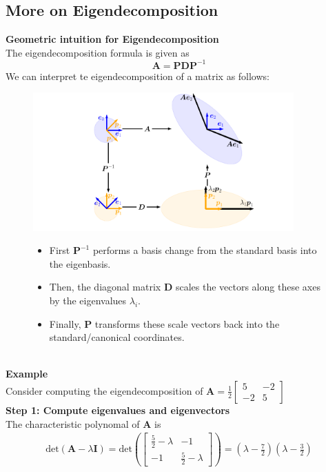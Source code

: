 \documentclass{report}
\begin{document}
\subsection{More on Eigendecomposition}%
\textbf{Geometric intuition for Eigendecomposition}\\
The eigendecomposition formula is given as
\begin{equation*}
\bm{A}=\bm{PDP}^{-1}
\end{equation*}
We can interpret te eigendecomposition of a matrix as follows: 
\begin{figure}[h]
\includegraphics[width=10cm]{20}\\
\centering
\begin{itemize}
\item First $\bm{P}^{-1}$ performs a basis change from the standard basis into the eigenbasis. 
\item Then, the diagonal matrix $\bm{D}$ scales the vectors along these axes by the eigenvalues $\lambda_i$. 
\item Finally, $\bm{P}$ transforms these
scale vectors back into the standard/canonical coordinates.\\
\end{itemize}
\end{figure}\\
\textbf{Example}\\
Consider computing the eigendecomposition of $\bm{A}=
\frac{1}{2}\begin{bmatrix}
5&-2\\-2&5\end{bmatrix}$\\
\textbf{Step 1: Compute eigenvalues and eigenvectors}\\
The characteristic polynomal of $\bm{A}$ is 
\begin{align*}
\text{det}(\bm{A}-\lambda\bm{I})=\text{det}\left(\begin{bmatrix}
\frac{5}{2}-\lambda&-1\\-1&\frac{5}{2}-\lambda
\end{bmatrix}\right)
=\left(\lambda-\frac{7}{2}\right)\left(\lambda-\frac{3}{2}\right)
\end{align*}
\end{document}
